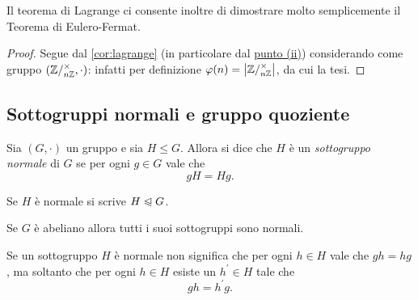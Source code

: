 Il teorema di Lagrange ci consente inoltre di dimostrare molto semplicemente il Teorema di Eulero-Fermat.
\begin{proof}
    Segue dal \autoref{cor:lagrange} (in particolare dal \hyperref[cor:x_alla_ordG=e_G]{punto (ii)}) considerando come gruppo $(\invertible{\Zmod{n}}, \cdot)$: infatti per definizione $\phi(n) = \abs*{\invertible{\Zmod{n}}}$, da cui la tesi.
\end{proof}

\subsection{Sottogruppi normali e gruppo quoziente}

\begin{definition}
     \label{def:sgr_normale}
    Sia $(G, \cdot)$ un gruppo e sia $H \leq G$. Allora si dice che $H$ è un \emph{sottogruppo normale} di $G$ se per ogni $g \in G$ vale che \begin{equation} \label{eq:def_normale}
        gH = Hg.
    \end{equation} 
    
    Se $H$ è normale si scrive $H \normal G$.
\end{definition}

\begin{remark}
    Se $G$ è abeliano allora tutti i suoi sottogruppi sono normali.
\end{remark}
\begin{remark}
    Se un sottogruppo $H$ è normale non significa che per ogni $h \in H$ vale che $gh = hg$, ma soltanto che per ogni $h \in H$ esiste un $h^\prime \in H$ tale che \[
        gh = h^\prime g.    
    \]
\end{remark}